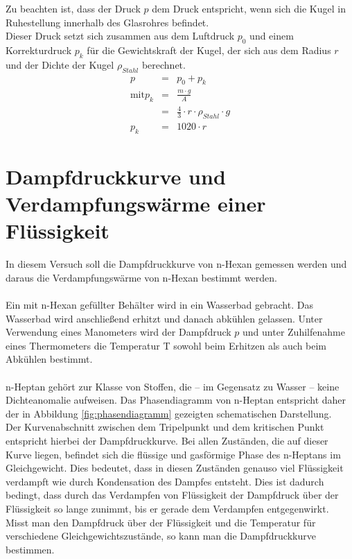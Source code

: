 \documentclass[a4paper,titlepage]{scrartcl}
\numberwithin{equation}{section}
\begin{document}
Zu beachten ist, dass der Druck $p$ dem Druck entspricht, wenn sich die Kugel in Ruhestellung innerhalb des Glasrohres befindet.\\
Dieser Druck setzt sich zusammen aus dem Luftdruck $p_0$ und einem Korrekturdruck $p_k$ für die Gewichtskraft der Kugel, der sich aus dem Radius $r$ und der Dichte der Kugel $\rho_{Stahl}$ berechnet.
\begin{eqnarray*}
p &=& p_0 + p_k\\
\text{mit} p_k &=& \frac{m \cdot g}{A}\\
&=& \frac{4}{3} \cdot r \cdot \rho_{Stahl} \cdot g\\
p_k &=& 1020 \cdot r
\end{eqnarray*}
\section{Dampfdruckkurve und Verdampfungswärme einer Flüssigkeit}
In diesem Versuch soll die Dampfdruckkurve von n-Hexan gemessen werden und daraus die Verdampfungswärme von n-Hexan bestimmt werden.\\ \\
Ein mit n-Hexan gefüllter Behälter wird in ein Wasserbad gebracht. Das Wasserbad wird anschließend erhitzt und danach abkühlen gelassen. Unter Verwendung eines Manometers wird der Dampfdruck $p$ und unter Zuhilfenahme eines Thermometers die Temperatur T sowohl beim Erhitzen als auch beim Abkühlen bestimmt.\\ \\
n-Heptan gehört zur Klasse von Stoffen, die – im Gegensatz zu Wasser – keine Dichteanomalie aufweisen. Das Phasendiagramm von n-Heptan entspricht daher der in Abbildung \ref{fig:phasendiagramm} gezeigten schematischen Darstellung.\\
Der Kurvenabschnitt zwischen dem Tripelpunkt und dem kritischen Punkt entspricht hierbei der Dampfdruckkurve. Bei allen Zuständen, die auf dieser Kurve liegen, befindet sich die flüssige und gasförmige Phase des n-Heptans im Gleichgewicht. Dies bedeutet, dass in diesen Zuständen genauso viel Flüssigkeit verdampft wie durch Kondensation des Dampfes entsteht. Dies ist dadurch bedingt, dass durch das Verdampfen von Flüssigkeit der Dampfdruck über der Flüssigkeit so lange zunimmt, bis er gerade dem Verdampfen entgegenwirkt.\\
Misst man den Dampfdruck über der Flüssigkeit und die Temperatur für verschiedene Gleichgewichtszustände, so kann man die Dampfdruckkurve bestimmen.
\end{document}

